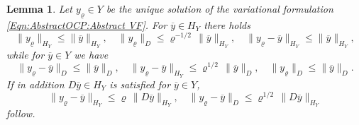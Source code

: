\documentclass{article}
\newtheorem{lemma}{Lemma}
\numberwithin{equation}{section}
\begin{document}
\begin{lemma}\label{Lemma:AbstractOCP:RegularizationErrorUnconstrained}
  Let $y_\varrho \in Y$ be the unique solution of the variational formulation
  \eqref{Eqn:AbstractOCP:Abstract VF}. For $\overline{y} \in H_Y$ there holds
  \[
    \| y_\varrho \|_{H_Y} \leq \| \overline{y} \|_{H_Y}, \quad
    \| y_\varrho \|_D \leq \varrho^{-1/2} \, \| \overline{y} \|_{H_Y}, \quad
    \| y_\varrho - \overline{y} \|_{H_Y} \leq \| \overline{y} \|_{H_Y}, 
  \]
  while for $\overline{y} \in Y$ we have
  \[
    \| y_\varrho - \overline{y} \|_D \leq \| \overline{y} \|_D , \quad
    \| y_\varrho - \overline{y} \|_{H_Y} \leq \varrho^{1/2} \,
    \| \overline{y} \|_D , \quad
    \| y_\varrho \|_D \leq \| \overline{y} \|_D .
  \]
  If in addition $D \overline{y} \in H_Y$ is satisfied for
  $\overline{y} \in Y$,
  \[
    \| y_\varrho - \overline{y} \|_{H_Y} \leq
    \varrho \, \| D \overline{y} \|_{H_Y}, \quad
    \| y_\varrho - \overline{y} \|_D \leq \varrho^{1/2} \,
    \| D \overline{y} \|_{H_Y} 
  \]
  follow.
\end{lemma}
%
\end{document}
